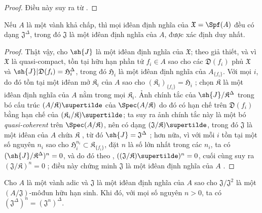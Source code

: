 \documentclass[oneside]{amsart}
\let\EGAOriginalLabel\label
\renewcommand{\label}[1]{\phantomsection\EGAOriginalLabel{#1}}
\begin{document}
\begin{proof}
Điều này suy ra từ .
\end{proof}

\begin{proposition}[10.3.5]
\label{I.10.3.5}
Nếu $A$ là một vành khả chấp, thì mọi iđêan định nghĩa của $\mathfrak{X}=\Spf(A)$ đều có dạng $\mathfrak{J}^\Delta$, trong đó $\mathfrak{J}$ là một iđêan định nghĩa của $A$, được xác định duy nhất.
\end{proposition}

\begin{proof}
Thật vậy, cho $\sh{J}$ là một iđêan định nghĩa của $\mathfrak{X}$; theo giả thiết, và vì $\mathfrak{X}$ là quasi-compact, tồn tại hữu hạn phần tử $f_i\in A$ sao cho các $\mathfrak{D}(f_i)$ phủ $\mathfrak{X}$ và $\sh{J}|\mathfrak{D}(f_i)=\mathfrak{H}_i^\Delta$, trong đó $\mathfrak{H}_i$ là một iđêan định nghĩa của $A_{\{f_i\}}$.
Với mọi $i$, do đó tồn tại một iđêan mở $\mathfrak{K}_i$ của $A$ sao cho $(\mathfrak{K}_i)_{\{f_i\}}=\mathfrak{H}_i$ ; chọn $\mathfrak{K}$ là một iđêan định nghĩa của $A$ nằm trong mọi $\mathfrak{K}_i$.
Ảnh chính tắc của $\sh{J}/\mathfrak{K}^\Delta$ trong bó cấu trúc $(A/\mathfrak{K})\supertilde$ của $\Spec(A/\mathfrak{K})$  do đó có hạn chế trên $\mathfrak{D}(f_i)$ bằng hạn chế của $(\mathfrak{K}_i/\mathfrak{K})\supertilde$;
ta suy ra ảnh chính tắc này là một bó \emph{quasi-coherent} trên $\Spec(A/\mathfrak{K})$, nên có dạng $(\mathfrak{J}/\mathfrak{K})\supertilde$, trong đó $\mathfrak{J}$ là một iđêan của $A$ chứa $\mathfrak{K}$ , từ đó $\sh{J}=\mathfrak{J}^\Delta$ ;
hơn nữa, vì với mỗi $i$ tồn tại một số nguyên $n_i$ sao cho $\mathfrak{H}_i^{n_i}\subset\mathfrak{K}_{\{f_i\}}$, đặt $n$ là số lớn nhất trong các $n_i$, ta có $(\sh{J}/\mathfrak{K}^\Delta)^n=0$, và do đó theo , $((\mathfrak{J}/\mathfrak{K})\supertilde)^n=0$, cuối cùng suy ra $(\mathfrak{J}/\mathfrak{K})^n=0$ ; điều này chứng minh $\mathfrak{J}$ là một iđêan định nghĩa của $A$ .
\end{proof}

\begin{proposition}[10.3.6]
\label{I.10.3.6}
Cho $A$ là một vành adic và $\mathfrak{J}$ là một iđêan định nghĩa của $A$ sao cho $\mathfrak{J}/\mathfrak{J}^2$ là một $(A/\mathfrak{J})$-môđun hữu hạn sinh. Khi đó, với mọi số nguyên $n>0$, ta có $(\mathfrak{J}^\Delta)^n=(\mathfrak{J}^n)^\Delta$.
\end{proposition}
\end{document}
